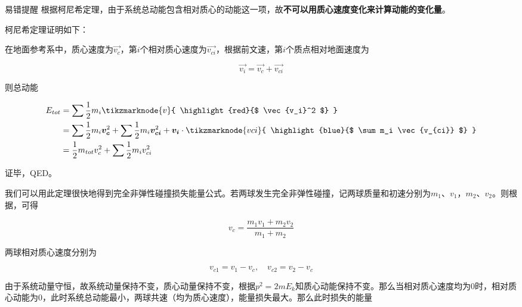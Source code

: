 \begin{mk}{易错提醒}{}
根据柯尼希定理，由于系统总动能包含相对质心的动能这一项，故\textbf{不可以用质心速度变化来计算动能的变化量}。
\end{mk}

柯尼希定理证明如下：

在地面参考系中，质心速度为$\vec{v_c}$，第$i$个相对质心速度为$\vec{v_{ci}}$，根据前文速，第$i$个质点相对地面速度为

$$\vec{v_i} = \vec{v_c} + \vec{v_{ci}}$$

则总动能

\begin{subequations}
\begin{align*}
E_{tot} &= \sum \frac{1}{2} m_i \tikzmarknode{v}{ \highlight{red}{$ \vec{v_i}^2 $} }\\
&= \sum \frac{1}{2} m_i \vec{v_c}^2 + \sum \frac{1}{2} m_i \vec{v_{ci}}^2 + \vec{v_i} \cdot \tikzmarknode{vci}{ \highlight{blue}{$ \sum m_i \vec{v_{ci}} $} } \\
&= \frac{1}{2} m_{tot} v_c^2 + \sum \frac{1}{2} m_i v_{ci}^2
\end{align*}
\end{subequations}



证毕，QED。 

我们可以用此定理很快地得到完全非弹性碰撞损失能量公式。若两球发生完全非弹性碰撞，记两球质量和初速分别为$m_1$、$v_1$，$m_2$、$v_2$。则根据，可得

$$v_c = \frac{m_1 v_1 + m_2 v_2}{m_1+m_2}$$

两球相对质心速度分别为

$$v_{c1} = v_1 - v_c ,\quad v_{c2} = v_2 - v_c$$

由于系统动量守恒，故系统动量保持不变，质心动量保持不变，根据$p^2 = 2 m E_k$知质心动能保持不变。那么当相对质心速度均为$0$时，相对质心动能为$0$，此时系统总动能最小，两球共速（均为质心速度），能量损失最大。那么此时损失的能量

